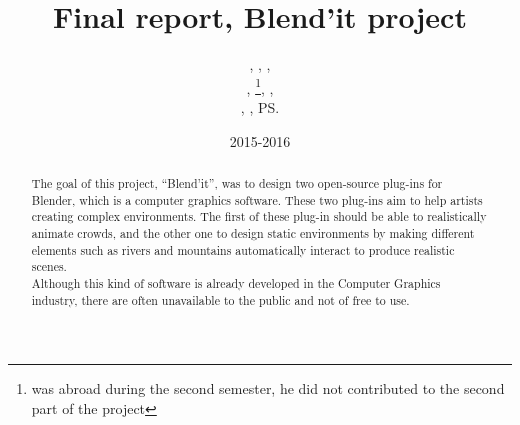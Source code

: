 \documentclass[a4paper,11pt]{article}
\title{Final report, Blend'it project}
\author{\bb, \gc, \dl,\\ \vl, \om\footnote{was abroad during the second semester, he did not contributed to the second part of the project}, \mr,\\ \me, \js, \ps}
\date{2015-2016}
\begin{document}
\maketitle
\vspace{12cm}
\begin{abstract}
The goal of this project, ``Blend'it'', was to design two open-source plug-ins for Blender, which is a computer graphics software. These two plug-ins aim to help artists creating complex environments. The first of these plug-in should be able to realistically animate crowds, and the other one to design static environments by making different elements such as rivers and mountains automatically interact to produce realistic scenes. \\
Although this kind of software is already developed in the Computer Graphics industry, there are often unavailable to the public and not of free to use.
\end{abstract}

\newpage
{}

\tableofcontents

\newpage


\newpage


\newpage


\newpage


\newpage




\newpage
\begingroup




\endgroup
\end{document}
